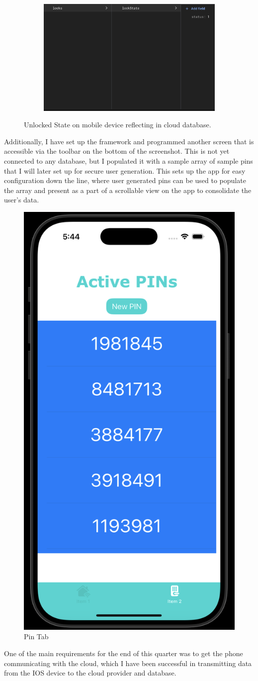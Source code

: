\begin{figure}[h]
\begin{subfigure}{0.3\textwidth}
         \caption{}
         \label{fig:1a}
     \end{subfigure}
     \begin{subfigure}{0.6\textwidth}
         \centering
         \includegraphics[width=\linewidth]{./img/lockState.png}
         \caption{}
         \label{fig:1b}
     \end{subfigure}
     \caption{Unlocked State on mobile device reflecting in cloud database.}
     \label{fig:1}
\end{figure}
\newpage
Additionally, I have set up the framework and programmed another screen that is accessible via the toolbar on the bottom of the screenshot. This is not yet connected to any database, but I populated it with a sample array of sample pins that I will later set up for secure user generation. This sets up the app for easy configuration down the line, where user generated pins can be used to populate the array and present as a part of a scrollable view on the app to consolidate the user's data.

\begin{figure}[htbp]
    \centering
    \includegraphics[width=0.4 \linewidth]{./img/pinPage.png}
    \caption{Pin Tab}
    \label{fig:pin}
\end{figure}
One of the main requirements for the end of this quarter was to get the phone communicating with the cloud, which I have been successful in transmitting data from the IOS device to the cloud provider and database.

